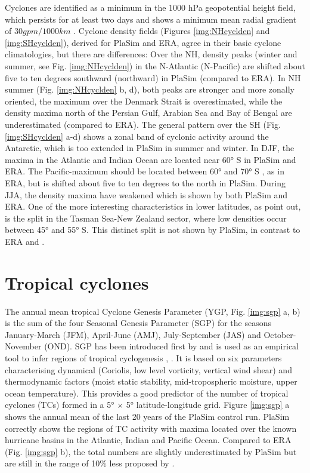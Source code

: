 \documentclass[12pt,a4paper,twoside,openright,headinclude,liststotoc,bibtotoc]{scrreprt}
\begin{document}
Cyclones are identified as a minimum in the 1000 hPa geopotential height field, which persists for at least two days and shows a minimum mean radial gradient of $30 gpm/1000 km$ \citep{Blender1997}. Cyclone density fields (Figures \ref{img:NHcyclden} and \ref{img:SHcyclden}), derived for PlaSim and ERA, agree in their basic cyclone climatologies, but there are differences: Over the NH, density peaks (winter and summer, see Fig. \ref{img:NHcyclden}) in the N-Atlantic (N-Pacific) are shifted about five to ten degrees southward (northward) in PlaSim (compared to ERA). In NH summer (Fig. \ref{img:NHcyclden} b, d), both peaks are stronger and more zonally oriented, the maximum over the Denmark Strait is overestimated, while the density maxima north of the Persian Gulf, Arabian Sea and Bay of Bengal are underestimated (compared to ERA). The general pattern over the SH (Fig. \ref{img:SHcyclden} a-d) shows a zonal band of cyclonic activity around the Antarctic, which is too extended in PlaSim in summer and winter. In DJF, the maxima in the Atlantic and Indian Ocean are located near 60° S in PlaSim and ERA. The Pacific-maximum should be located between 60° and 70° S \citep{Simmonds2000}, as in ERA, but is shifted about five to ten degrees to the north in PlaSim. During JJA, the density maxima have weakened which is shown by both PlaSim and ERA. One of the more interesting characteristics in lower latitudes, as \citet{Simmonds2000} point out, is the split in the Tasman Sea-New Zealand sector, where low densities occur between 45° and 55° S. This distinct split is not shown by PlaSim, in contrast to ERA and \citet{Simmonds2000}.

\vspace{-0.4cm}
\section{Tropical cyclones}
\vspace{-0.4cm}

The annual mean tropical Cyclone Genesis Parameter (YGP, Fig. \ref{img:sgp} a, b) is the sum of the four Seasonal Genesis Parameter (SGP) for the seasons January-March (JFM), April-June (AMJ), July-September (JAS) and October-November (OND). SGP has been introduced first by \citet{Gray1975} and is used as an empirical tool to infer regions of tropical cyclogenesis \citep{Caron2008}, \citep{Ryan1992}. It is based on six parameters characterising dynamical (Coriolis, low level vorticity, vertical wind shear) and thermodynamic factors (moist static stability, mid-tropospheric moisture, upper ocean temperature). This provides a good predictor of the number of tropical cyclones (TCs) formed in a 5° $\times$ 5° latitude-longitude grid. Figure \ref{img:sgp} a shows the annual mean of the last 20 years of the PlaSim control run. PlaSim correctly shows the regions of TC activity with maxima located over the known hurricane basins in the Atlantic, Indian and Pacific Ocean. Compared to ERA (Fig. \ref{img:sgp} b), the total numbers are slightly underestimated by PlaSim but are still in the range of 10\% less proposed by \citet{Ryan1992}.  
\end{document}
